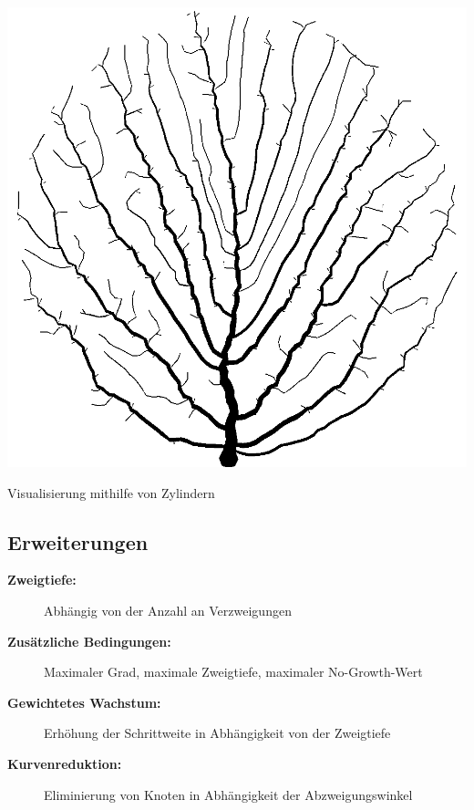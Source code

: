 \newpage
{}
\begin{center}
	\includegraphics[height=.9\textheight]{images/CH3_SCA_Extended4.png}
	
	Visualisierung mithilfe von Zylindern
\end{center}





\newpage
\slidetitle{}
\subsection{Erweiterungen\\}

\begin{description}
	\item[\textbf{Zweigtiefe:}] Abhängig von der Anzahl an Verzweigungen\\
	
	\item[\textbf{Zusätzliche Bedingungen:}] Maximaler Grad, maximale Zweigtiefe, maximaler \glqq No-Growth\grqq -Wert\\
	
	\item[\textbf{Gewichtetes Wachstum:}] Erhöhung der Schrittweite in Abhängigkeit von der Zweigtiefe\\
	
	\item[\textbf{Kurvenreduktion:}] Eliminierung von Knoten in Abhängigkeit der Abzweigungswinkel\\
\end{description}





\newpage
{}